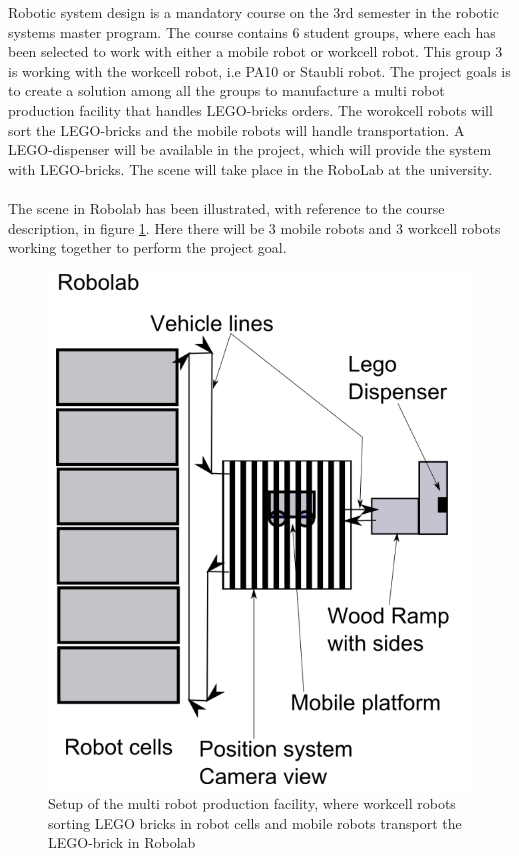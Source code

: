 Robotic system design is a mandatory course on the 3rd semester in the robotic systems master program. The course contains 6 student groups, where each has been selected to work with either a mobile robot or workcell robot. This group 3 is working with the workcell robot, i.e PA10 or Staubli robot. The project goals is to create a solution among all the groups to manufacture a multi robot production facility that handles LEGO-bricks orders. The worokcell robots will sort the LEGO-bricks and the mobile robots will handle transportation. A LEGO-dispenser will be available in the project, which will provide the system with LEGO-bricks. The scene will take place in the RoboLab at the university. 
\\
\\
The scene in Robolab has been illustrated, with reference to the course description, in figure \ref{fig:workZone}. Here there will be 3 mobile robots and 3 workcell robots working together to perform the project goal. 


\begin{figure}[ht]
\centering
\includegraphics[scale=0.4]{images/workZone.png}
\caption{Setup of the multi robot production facility, where workcell robots sorting LEGO bricks in robot cells and mobile robots transport the LEGO-brick in Robolab}
\label{fig:workZone}
\end{figure}

